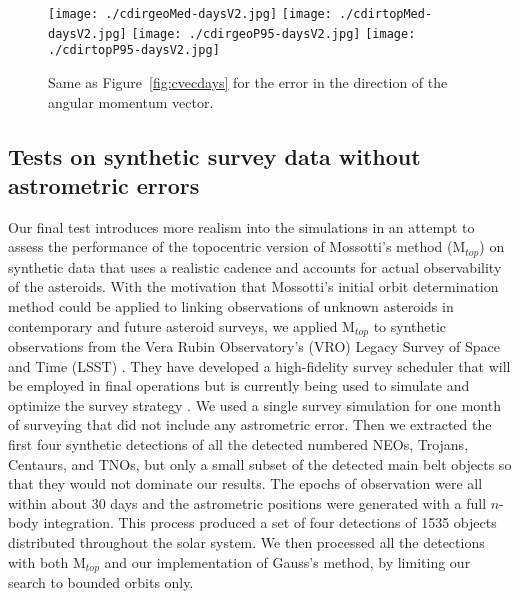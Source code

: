 \documentclass[11pt]{article}
\begin{document}
\begin{figure}[ht!]
    \centering
    \texttt{[image: ./cdirgeoMed-daysV2.jpg]}
    \texttt{[image: ./cdirtopMed-daysV2.jpg]}
    \texttt{[image: ./cdirgeoP95-daysV2.jpg]}
    \texttt{[image: ./cdirtopP95-daysV2.jpg]}
    \vspace{-3mm}
    \caption{Same as Figure~\ref{fig:cvecdays} for the error in the direction of the angular momentum vector.}
    \label{fig:cdirdays}
\end{figure}


\subsection{Tests on synthetic survey data without astrometric errors}
\label{s:synthetic-survey-tests}

Our final test introduces more realism into the simulations in an attempt to assess the performance of the topocentric version of Mossotti's method (M$_{top}$) on synthetic data that uses a realistic cadence and accounts for actual observability of the asteroids. 
With the motivation that Mossotti's initial orbit determination method could be applied to linking observations of unknown asteroids in contemporary and future asteroid surveys, we applied M$_{top}$ to synthetic observations from the Vera Rubin Observatory's (VRO) Legacy Survey of Space and Time (LSST) \cite{Ivezic2008-LSST}. 
They have developed a high-fidelity survey scheduler that will be employed in final operations but is currently being used to simulate and optimize the survey strategy \cite{Connolly2014-LSSTsims,Delgado2016-LSSTscheduler,Naghib2018-LSSTscheduler}.
We used a single survey simulation for one month of surveying that did not include any astrometric error. 
Then we extracted the first four synthetic detections of all the detected numbered NEOs, Trojans, Centaurs, and TNOs, but only a small subset of the detected main belt objects so that they would not dominate our results. 
The epochs of observation were all within about 30 days and the astrometric positions were generated with a full $n$-body integration. 
This process produced a set of four detections of 1535 objects distributed throughout the solar system.  
We then processed all the detections with both M$_{top}$ and our implementation of Gauss's method, by limiting our search to bounded orbits only.
\end{document}
